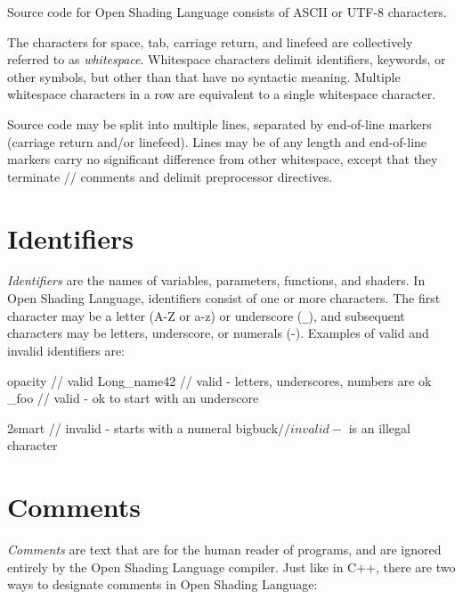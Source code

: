 \documentclass[11pt,letterpaper]{book}
\def\langname{Open Shading Language\xspace}
\begin{document}
Source code for \langname consists of ASCII or UTF-8 characters.

The characters for space, tab, carriage return, and linefeed are
collectively referred to as \emph{whitespace}.  Whitespace characters
delimit identifiers, keywords, or other symbols, but other than that
have no syntactic meaning.  Multiple whitespace characters in a row
are equivalent to a single whitespace character. 

Source code may be split into multiple lines, separated by end-of-line
markers (carriage return and/or linefeed).  Lines may be of any length
and end-of-line markers carry no significant difference from other 
whitespace, except that they terminate {\cf //} comments and delimit
preprocessor directives.

\section{Identifiers}
\label{sec:identifiers}

\emph{Identifiers} are the names of variables, parameters, functions,
and shaders.  In \langname, identifiers consist of one or more
characters.  The first character may be a letter ({\cf A}-{\cf Z} or
{\cf a}-{\cf z}) or underscore (\verb|_|), and subsequent characters may
be letters, underscore, or numerals ({}-{}).  Examples of
valid and invalid identifiers are:

\begin{code}
    opacity       // valid
    Long_name42   // valid - letters, underscores, numbers are ok
    _foo          // valid - ok to start with an underscore

    2smart        // invalid - starts with a numeral
    bigbuck$      // invalid - $ is an illegal character
\end{code}


\section{Comments}
\label{sec:comments}

\emph{Comments} are text that are for the human reader of programs, and
are ignored entirely by the \langname compiler.  Just like in C++, there
are two ways to designate comments in \langname:
\end{document}
